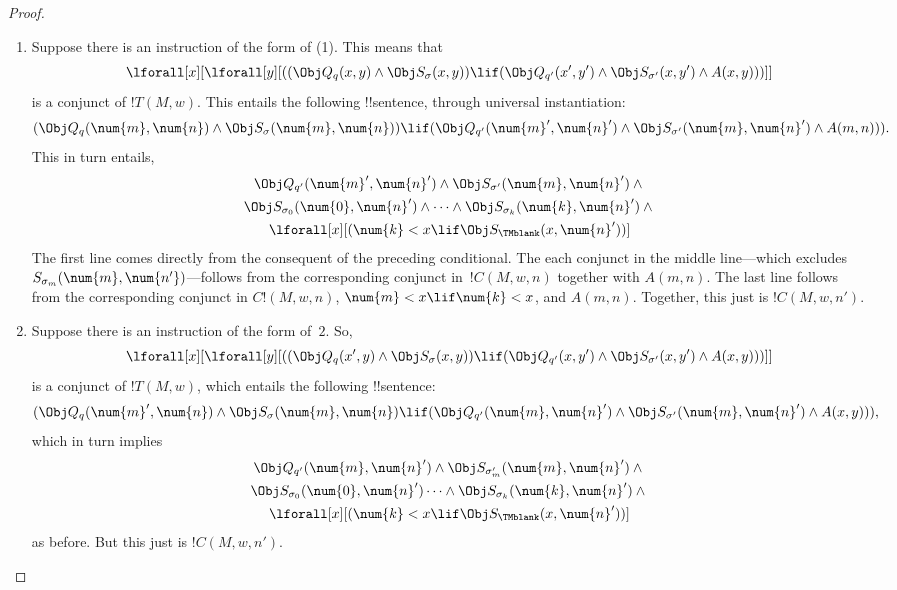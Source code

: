 \documentclass[../../../include/open-logic-section]{subfiles}
\begin{document}
\begin{proof}
\begin{enumerate} 
\item Suppose there is an instruction of the form of (1).
This means that 
\[ 
\lforall[x][\lforall[y][((\Obj Q_{q}(x,
y) \land \Obj S_\sigma(x, y)) \lif (\Obj Q_{q'}(x',
y') \land \Obj S_{\sigma'}(x, y') \land A(x, y)))]]
\] 
is a conjunct of $!T(M,w)$. This entails the following
!!{sentence}, through universal instantiation: 
\[ 
(\Obj Q_{q}(\num{m}, \num{n}) \land \Obj S_{\sigma}(\num{m}, \num{n})) \lif (\Obj
Q_{q'}(\num{m}', \num{n}') \land \Obj S_{\sigma'}(\num{m}, \num{n}') \land A(m, n))).
\]
This in turn entails,
\begin{multline*}
\Obj Q_{q'}(\num{m}', \num{n}') \land \Obj S_{\sigma'}(\num{m},
\num{n}') \land {}\\
\Obj S_{\sigma_0}(\num{0}, \num{n}') \land \dots \land
\Obj S_{\sigma_k}(\num{k}, \num{n}') \land {}\\
\lforall[x][(\num{k} < x
  \lif \Obj S_\TMblank(x, \num{n}'))]
\end{multline*}
The first line comes directly from the consequent of the preceding
conditional. The each conjunct in the middle line---which excludes
$S_{\sigma_m}(\num{m},\num{n'})$---follows from the corresponding
conjunct in~$!C(M, w, n)$ together with $A(m, n)$. The last line
follows from the corresponding conjunct in $C!(M, w, n)$, $\num{m} < x
\lif \num{k} < x$, and $A(m, n)$.  Together, this just is $!C(M, w, n')$.

\item Suppose there is an instruction of the form of~$2$. So, 
\[
\lforall[x][\lforall[y][((\Obj Q_{q}(x', y) \land \Obj
S_{\sigma}(x, y)) \lif (\Obj Q_{q'}(x, y') \land \Obj
S_{\sigma'}(x, y') \land A(x, y)))]] 
\] 
is a conjunct of $!T(M,w)$, which entails the following !!{sentence}: 
\[ 
(\Obj Q_{q}(\num{m}', \num{n}) \land \Obj S_{\sigma}(\num{m}, \num{n}) \lif
(\Obj Q_{q'}(\num{m}, \num{n}') \land \Obj S_{\sigma'}(\num{m}, \num{n}') \land A(x, y))),
\]
which in turn implies
\begin{multline*}
  \Obj Q_{q'}(\num{m}, \num{n}') \land \Obj S_{\sigma'_m}(\num{m},
  \num{n}') \land {}\\
  \Obj S_{\sigma_0}(\num{0}, \num{n}')\dots \land
  \Obj S_{\sigma_k}(\num{k}, \num{n}')  \land {} \\
  \lforall[x][(\num{k} < x
  \lif \Obj S_\TMblank(x, \num{n}'))]
\end{multline*}
as before. But this just is $!C(M, w, n')$.


\end{enumerate}
\end{proof}
\end{document}
